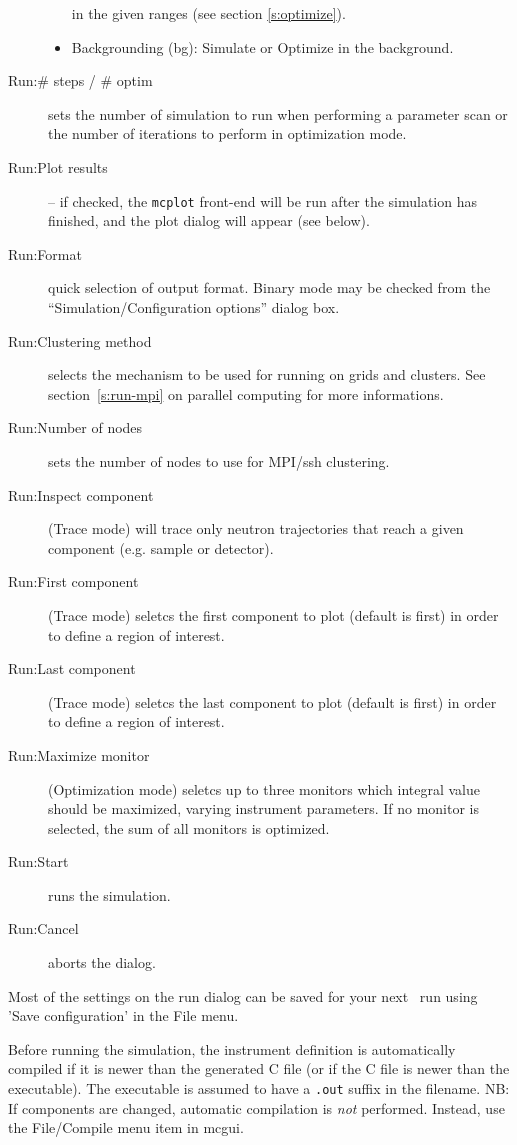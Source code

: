 \begin{description}
\begin{itemize}
    in the given ranges (see section \ref{s:optimize}).
  \item Backgrounding (bg): Simulate or Optimize in the background.
\end{itemize}
\item[Run:\# steps / \# optim] sets the number of simulation to run when
  performing a parameter scan or the number of iterations to
  perform in optimization mode.
\item[Run:Plot results] -- if checked, the \verb+mcplot+ front-end will be run
  after the simulation has finished, and the plot dialog will appear
  (see below).
\item[Run:Format] quick selection of output format. Binary mode may be checked
  from the ``Simulation/Configuration options'' dialog box.
\item[Run:Clustering method] selects the mechanism to be used for running on
  grids and clusters.  See section~\ref{s:run-mpi} on parallel computing for
  more informations.
\item[Run:Number of nodes] sets the number of nodes to use for MPI/ssh
  clustering.
\item[Run:Inspect component] (Trace mode) will trace only neutron trajectories
  that reach a given component (e.g. sample or detector).
\item[Run:First component] (Trace mode) seletcs the first component to plot
  (default is first) in order to define a region of interest.
\item[Run:Last component] (Trace mode) seletcs the last component to plot
  (default is first) in order to define a region of interest.
\item[Run:Maximize monitor] (Optimization mode) seletcs up to three monitors
  which integral value should be maximized, varying instrument parameters. If no
  monitor is selected, the sum of all monitors is optimized.
\item[Run:Start] runs the simulation.
\item[Run:Cancel] aborts the dialog.
\end{description}
Most of the settings on the run dialog can be saved for your next
\MCS\ run using 'Save configuration' in the File menu.

Before running the simulation, the instrument definition is automatically
compiled if it is newer than the generated C file (or if the C file is newer
than the executable). The executable is assumed to have a \verb+.out+ suffix in
the filename. NB: If components are changed, automatic compilation is \emph{not}
performed. Instead, use the File/Compile menu item in mcgui.



